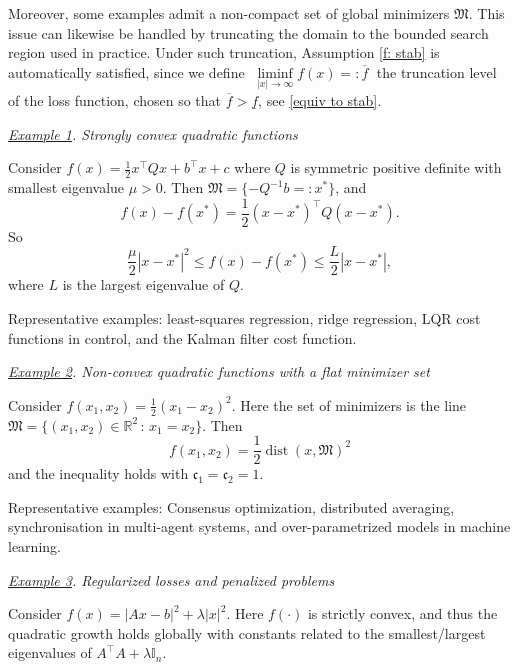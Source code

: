 \documentclass[12pt]{amsart}
\numberwithin{equation}{section}
\theoremstyle{plain}
\begin{document}
Moreover, some examples admit a non-compact set of global minimizers $\mathfrak{M}$. This issue can likewise be handled by truncating the domain to the bounded search region used in practice. Under such truncation, Assumption \ref{f: stab} is automatically satisfied, since we define $\;\liminf\limits_{|x|\to \infty} f(x) =: \overline{f}\;$ the truncation level of the loss function, chosen so that $\overline{f}> \underline{f}$, see \eqref{equiv to stab}.


\textbullet\; \textit{\underline{Example 1}. Strongly convex quadratic functions} 

Consider $f(x) = \frac{1}{2}x^{\top} Q x + b^{\top}x + c$ where $Q$ is symmetric positive definite with smallest eigenvalue $\mu>0$. Then $\mathfrak{M} = \{-Q^{-1}b =: x^{*}\}$, and
\begin{equation*}
	f(x) -f(x^{*}) = \frac{1}{2}(x - x^{*})^{\top} Q (x-x^{*}).
\end{equation*}
So
\begin{equation*}
	\frac{\mu}{2} |x-x^{*}|^{2} \leq f(x) -f(x^{*}) \leq \frac{L}{2} |x-x^{*}|,
\end{equation*}
where $L$ is the largest eigenvalue of $Q$. 

Representative examples: least-squares regression, ridge regression, LQR cost functions in control, and the Kalman filter cost function.





\textbullet\; \textit{\underline{Example 2}. Non-convex quadratic functions with a flat minimizer set}

Consider $f(x_{1}, x_{2}) = \frac{1}{2}(x_{1} - x_{2})^{2}$. Here the set of minimizers is the line $\mathfrak{M} = \{(x_{1},x_{2})\in \mathbb{R}^{2} \,:\, x_{1} = x_{2}\}$. Then 
\begin{equation*}
	f(x_{1},x_{2}) = \frac{1}{2} \operatorname{dist}(x,\mathfrak{M})^{2}
\end{equation*}
and the inequality holds with $\mathfrak{c}_{1}=\mathfrak{c}_{2} = 1$.

Representative examples: Consensus optimization, distributed averaging, synchronisation in multi-agent systems, and over-parametrized models in machine learning.


\textbullet\; \textit{\underline{Example 3}. Regularized losses and penalized problems}

Consider  $f(x) = |Ax - b|^{2} + \lambda|x|^{2}$. Here $f(\cdot)$ is strictly convex, and thus the quadratic growth holds globally with constants related to the smallest/largest eigenvalues of $A^{\top}A + \lambda \mathbb{I}_{n}$. 
\end{document}
